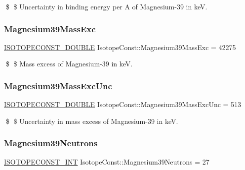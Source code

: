 \$ \$ Uncertainty in binding energy per A of Magnesium-\/39 in keV. \mbox{\label{group___isotope_const-_magnesium-_mg39_ga3cc6044daf5f8fedd7d50b31c9613a70}} 
\subsubsection{\texorpdfstring{Magnesium39\+Mass\+Exc}{Magnesium39MassExc}}
{\footnotesize\ttfamily \mbox{\hyperlink{group___isotope_const-_macros_ga8f45a7272ce02c0b4c65c44636ed719a}{I\+S\+O\+T\+O\+P\+E\+C\+O\+N\+S\+T\+\_\+\+D\+O\+U\+B\+LE}} Isotope\+Const\+::\+Magnesium39\+Mass\+Exc = 42275}

\$ \$ Mass excess of Magnesium-\/39 in keV. \mbox{\label{group___isotope_const-_magnesium-_mg39_ga17ef0af1825cecdc8be707285ceeab93}} 
\subsubsection{\texorpdfstring{Magnesium39\+Mass\+Exc\+Unc}{Magnesium39MassExcUnc}}
{\footnotesize\ttfamily \mbox{\hyperlink{group___isotope_const-_macros_ga8f45a7272ce02c0b4c65c44636ed719a}{I\+S\+O\+T\+O\+P\+E\+C\+O\+N\+S\+T\+\_\+\+D\+O\+U\+B\+LE}} Isotope\+Const\+::\+Magnesium39\+Mass\+Exc\+Unc = 513}

\$ \$ Uncertainty in mass excess of Magnesium-\/39 in keV. \mbox{\label{group___isotope_const-_magnesium-_mg39_ga95b852bce734e581cdfef6c43ba04d25}} 
\subsubsection{\texorpdfstring{Magnesium39\+Neutrons}{Magnesium39Neutrons}}
{\footnotesize\ttfamily \mbox{\hyperlink{group___isotope_const-_macros_ga5f18360b3e99483a35c32d789e62621c}{I\+S\+O\+T\+O\+P\+E\+C\+O\+N\+S\+T\+\_\+\+I\+NT}} Isotope\+Const\+::\+Magnesium39\+Neutrons = 27}

